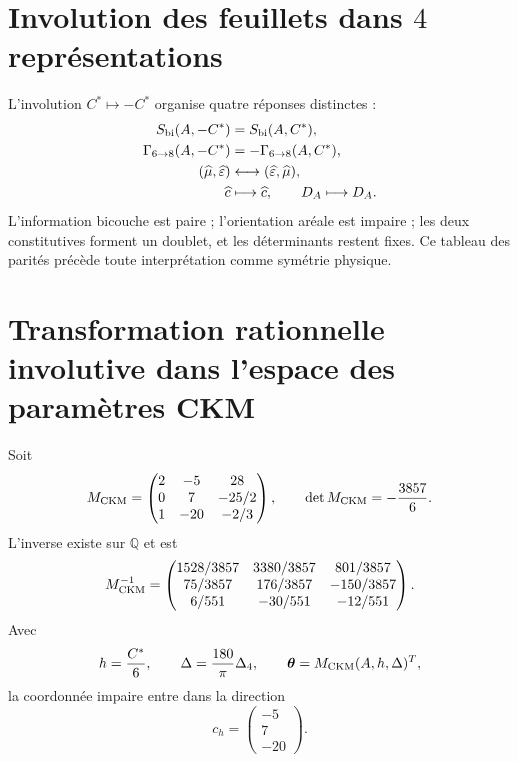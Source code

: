 \section{Involution des feuillets dans \(4\) représentations}

L'involution \(C^*\mapsto-C^*\) organise quatre réponses distinctes :
\begin{equation}
\label{rm:eq:modular-sheet-parities}
\begin{aligned}
S_{\rm bi}(A,-C^*)&=S_{\rm bi}(A,C^*),\\
\Gamma_{6\to8}(A,-C^*)&=-\Gamma_{6\to8}(A,C^*),\\
(\widehat\mu,\widehat\varepsilon)&\longleftrightarrow
(\widehat\varepsilon,\widehat\mu),\\
\widehat c&\longmapsto\widehat c,
\qquad D_A\longmapsto D_A.
\end{aligned}
\end{equation}
L'information bicouche est paire ; l'orientation aréale est impaire ; les deux
constitutives forment un doublet, et les déterminants restent fixes. Ce tableau
des parités précède toute interprétation comme symétrie physique.

\section{Transformation rationnelle involutive dans l'espace des paramètres CKM}

Soit
\begin{equation}
\label{rm:eq:modular-Mckm}
M_{\rm CKM}=
\begin{pmatrix}
2&-5&28\\
0&7&-25/2\\
1&-20&-2/3
\end{pmatrix},
\qquad
\det M_{\rm CKM}=-\frac{3857}{6}.
\end{equation}
L'inverse existe sur \(\mathbb Q\) et est
\begin{equation}
\label{rm:eq:modular-Mckm-inverse}
M_{\rm CKM}^{-1}=
\begin{pmatrix}
1528/3857&3380/3857&801/3857\\
75/3857&176/3857&-150/3857\\
6/551&-30/551&-12/551
\end{pmatrix}.
\end{equation}
Avec
\begin{equation}
\label{rm:eq:modular-ckm-coordinates}
h=\frac{C^*}{6},
\qquad
\Delta=\frac{180}{\pi}\Delta_4,
\qquad
\boldsymbol\theta=M_{\rm CKM}(A,h,\Delta)^T,
\end{equation}
la coordonnée impaire entre dans la direction
\begin{equation}
\label{rm:eq:modular-ch}
c_h=\begin{pmatrix}-5\\7\\-20\end{pmatrix}.
\end{equation}

